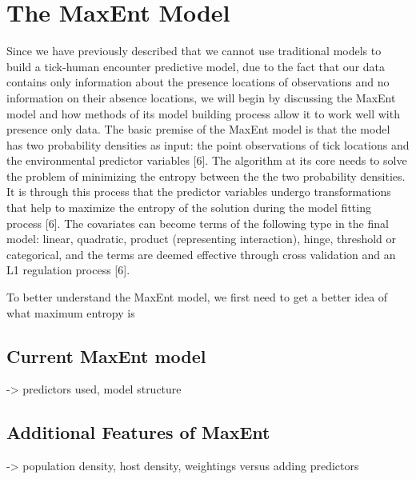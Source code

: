 \section{The MaxEnt Model}
Since we have previously described that we cannot use traditional models to build a tick-human encounter predictive model, due to the fact that our data contains only information about the presence locations of observations and no information on their absence locations, we will begin by discussing the MaxEnt model and how methods of its model building process allow it to work well with presence only data. The basic premise of the MaxEnt model is that the model has two probability densities as input: the point observations of tick locations and the environmental predictor variables [6]. The algorithm at its core needs to solve the problem of minimizing the entropy between the the two probability densities. It is through this process that the predictor variables undergo transformations that help to maximize the entropy of the solution during the model fitting process [6]. The covariates can become terms of the following type in the final model: linear, quadratic, product (representing interaction), hinge, threshold or categorical, and the terms are deemed effective through cross validation and an L1 regulation process [6].  \newline

\noindent To better understand the MaxEnt model, we first need to get a better idea of what maximum entropy is \newline


\subsection{Current MaxEnt model}

-> predictors used, model structure \newline


\subsection{Additional Features of MaxEnt}

-> population density, \newline host density, \newline weightings versus adding predictors \newline




